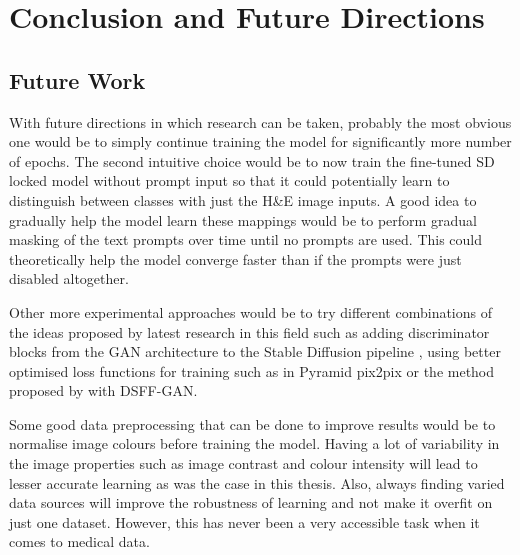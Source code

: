 
\chapter{Conclusion and Future Directions } %



\ifpdf
    \graphicspath{{6_conclusions/figures/PNG/}{6_conclusions/figures/PDF/}{6_conclusions/figures/}}
\else
    \graphicspath{{6_conclusions/figures/EPS/}{6_conclusions/figures/}}
\fi



\section{Future Work}

With future directions in which research can be taken, probably the most obvious one would be to simply continue training the model for significantly more number of epochs. The second intuitive choice would be to now train the fine-tuned SD locked model without prompt input so that it could potentially learn to distinguish between classes with just the H\&E image inputs. A good idea to gradually help the model learn these mappings would be to perform gradual masking of the text prompts over time until no prompts are used. This could theoretically help the model converge faster than if the prompts were just disabled altogether. 

Other more experimental approaches would be to try different combinations of the ideas proposed by latest research in this field such as adding discriminator blocks from the GAN architecture to the Stable Diffusion pipeline \parencite{Wang2022Diffusion-GAN:Diffusion}, using better optimised loss functions for training such as in Pyramid pix2pix \parencite{Liu2022BCI:Pix2pix}
or the method proposed by \textcite{Ma2024DSFF-GAN:Cancer} with DSFF-GAN.

Some good data preprocessing that can be done to improve results would be to normalise image colours before training the model. Having a lot of variability in the image properties such as image contrast and colour intensity will lead to lesser accurate learning as was the case in this thesis. Also, always finding varied data sources will improve the robustness of learning and not make it overfit on just one dataset. However, this has never been a very accessible task when it comes to medical data.

